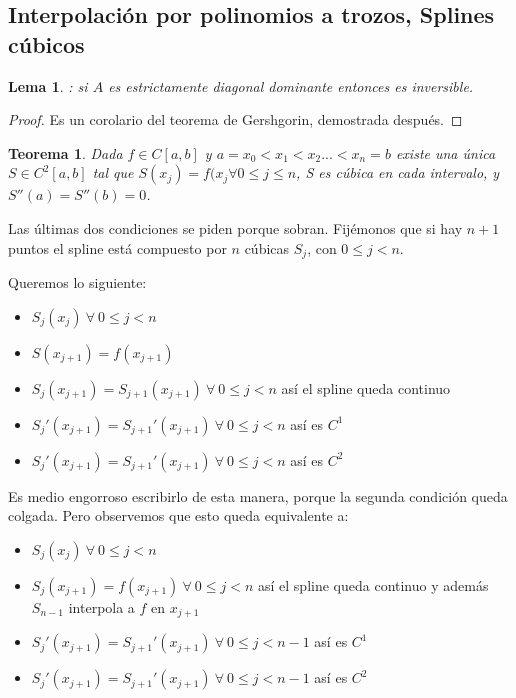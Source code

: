 \documentclass[10pt,a4paper,final]{report}
\newtheorem{theorem}{Teorema}
\newtheorem{lemma}{Lema}
\begin{document}
{\subsection{Interpolación por polinomios a trozos, Splines cúbicos}

\begin{lemma}: si $A$ es estrictamente diagonal dominante entonces es inversible.
\end{lemma}
\begin{proof}
	Es un corolario del teorema de Gershgorin, demostrada después.
\end{proof}

\begin{theorem} Dada $f \in C[a,b]$ y $a = x_0 < x_1 < x_2 ... < x_n = b$ existe una única $S \in C^2[a,b]$ tal que $S(x_j)=f(x_j \forall 0\leq j \leq n$, S es cúbica en cada intervalo, y $S''(a) = S''(b)=0$.
\end{theorem}

Las últimas dos condiciones se piden porque sobran. Fijémonos que si hay $n+1$ puntos el spline está compuesto por $n$ cúbicas $S_j$, con $0\leq j < n$.

Queremos lo siguiente:

\begin{itemize}
	\item $S_j(x_j)\ \forall\ 0 \leq j < n$
	\item $S(x_{j+1}) = f(x_{j+1})$
	\item $S_j(x_{j+1}) = S_{j+1}(x_{j+1})\ \forall\ 0 \leq j < n$ así el spline queda continuo
	\item $S_j'(x_{j+1}) = S_{j+1}'(x_{j+1})\ \forall\ 0 \leq j < n$ así es $C^1$
	\item $S_j'(x_{j+1}) = S_{j+1}'(x_{j+1})\ \forall\ 0 \leq j < n$ así es $C^2$
\end{itemize}

Es medio engorroso escribirlo de esta manera, porque la segunda condición queda colgada. Pero observemos que esto queda equivalente a:


\begin{itemize}
	\item $S_j(x_j)\ \forall\ 0 \leq j < n$
	\item $S_j(x_{j+1}) = f(x_{j+1})\ \forall\ 0 \leq j < n$ así el spline queda continuo y además $S_{n-1}$ interpola a $f$ en $x_{j+1}$
	\item $S_j'(x_{j+1}) = S_{j+1}'(x_{j+1})\ \forall\ 0 \leq j < n-1$ así es $C^1$
	\item $S_j'(x_{j+1}) = S_{j+1}'(x_{j+1})\ \forall\ 0 \leq j < n-1$ así es $C^2$
\end{itemize}

}
\end{document}
